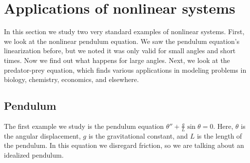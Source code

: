
\sectionnewpage
\section{Applications of nonlinear systems}
\label{nlinapps:section}


In this section we study two very standard examples of nonlinear
systems.  First, we look at the nonlinear pendulum equation.  We saw
the pendulum equation's linearization before, but we noted it
was only valid for small angles and short times.  Now we find out what
happens for large angles.  Next, we look at the predator-prey equation,
which finds various applications in modeling problems in biology, chemistry,
economics, and elsewhere.

\subsection{Pendulum}

The first example we study is the pendulum equation
$\theta''+\frac{g}{L} \sin \theta = 0$.  Here, $\theta$ is the angular
displacement, $g$ is the gravitational constant, and $L$ is the length of
the pendulum.  In this equation we disregard friction, so we are talking
about an idealized pendulum.

